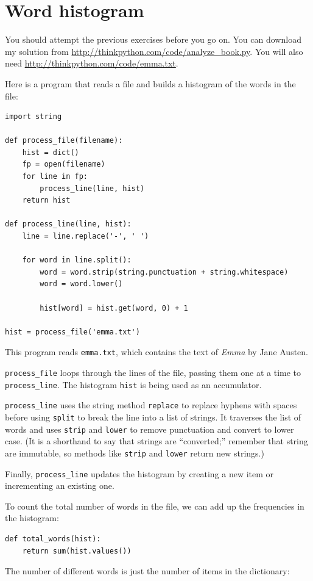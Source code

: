 \documentclass[10pt]{book}
\begin{document}
\section{Word histogram}

You should attempt the previous exercises before you go on.
You can download my solution from
 \url{http://thinkpython.com/code/analyze_book.py}.  You will
also need \url{http://thinkpython.com/code/emma.txt}.

Here is a program that reads a file and builds a histogram of the
words in the file:

\begin{verbatim}
import string

def process_file(filename):
    hist = dict()
    fp = open(filename)
    for line in fp:
        process_line(line, hist)
    return hist

def process_line(line, hist):
    line = line.replace('-', ' ')

    for word in line.split():
        word = word.strip(string.punctuation + string.whitespace)
        word = word.lower()

        hist[word] = hist.get(word, 0) + 1

hist = process_file('emma.txt')
\end{verbatim}
%
This program reads {\tt emma.txt}, which contains the text of {\em
  Emma} by Jane Austen.

\verb"process_file" loops through the lines of the file,
passing them one at a time to \verb"process_line".  The histogram
{\tt hist} is being used as an accumulator.

\verb"process_line" uses the string method {\tt replace} to replace
hyphens with spaces before using {\tt split} to break the line into a
list of strings.  It traverses the list of words and uses {\tt strip}
and {\tt lower} to remove punctuation and convert to lower case.  (It
is a shorthand to say that strings are ``converted;'' remember that
string are immutable, so methods like {\tt strip} and {\tt lower}
return new strings.)

Finally, \verb"process_line" updates the histogram by creating a new
item or incrementing an existing one.

To count the total number of words in the file, we can add up
the frequencies in the histogram:

\begin{verbatim}
def total_words(hist):
    return sum(hist.values())
\end{verbatim}
%
The number of different words is just the number of items in
the dictionary:
\end{document}
